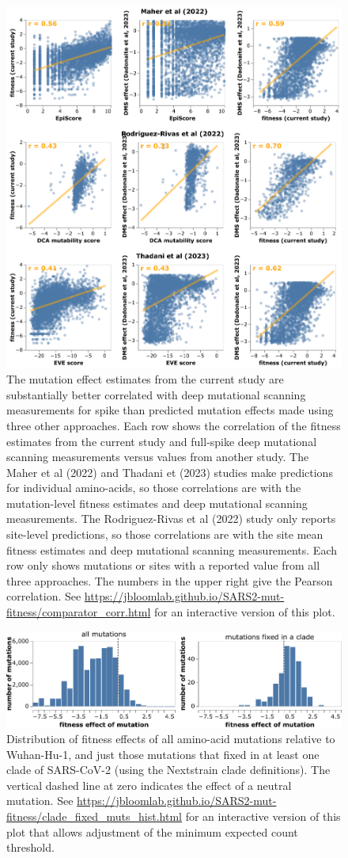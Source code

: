 \documentclass[9pt,twocolumn,twoside]{gsajnl_modified}
\begin{document}
\begin{figure}[h]
\centering
\includegraphics[width=0.75\linewidth]{figs/comparator_corr.png}
\caption{
The mutation effect estimates from the current study are substantially better correlated with deep mutational scanning measurements for spike than predicted mutation effects made using three other approaches.
Each row shows the correlation of the fitness estimates from the current study and full-spike deep mutational scanning measurements versus values from another study.
The Maher et al (2022) and Thadani et (2023) studies make predictions for individual amino-acids, so those correlations are with the mutation-level fitness estimates and deep mutational scanning measurements.
The Rodriguez-Rivas et al (2022) study only reports site-level predictions, so those correlations are with the site mean fitness estimates and deep mutational scanning measurements.
Each row only shows mutations or sites with a reported value from all three approaches.
The numbers in the upper right give the Pearson correlation.
See \url{https://jbloomlab.github.io/SARS2-mut-fitness/comparator_corr.html} for an interactive version of this plot.
\label{fig:comparator}
}
\end{figure}

\begin{figure}
\centering
\includegraphics[width=0.7\linewidth]{figs/fixed_dist.pdf}
\caption{
Distribution of fitness effects of all amino-acid mutations relative to Wuhan-Hu-1, and just those mutations that fixed in at least one clade of SARS-CoV-2 (using the Nextstrain clade definitions).
The vertical dashed line at zero indicates the effect of a neutral mutation.
See \url{https://jbloomlab.github.io/SARS2-mut-fitness/clade_fixed_muts_hist.html} for an interactive version of this plot that allows adjustment of the minimum expected count threshold.
\label{fig:fixed_dist}
}
\end{figure}
\end{document}
